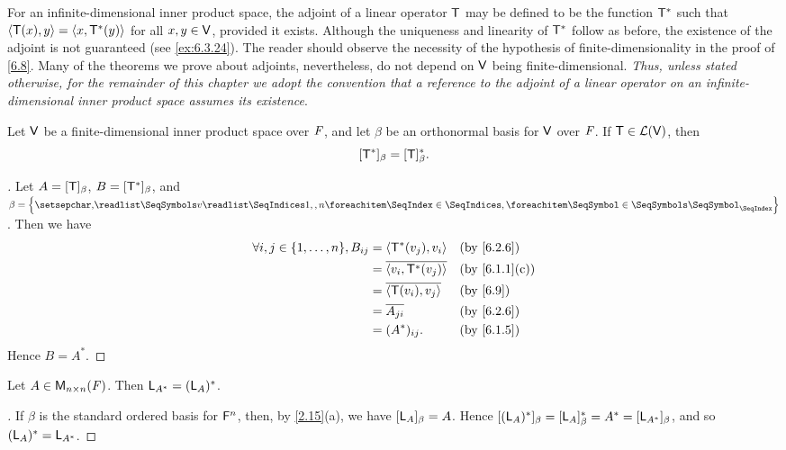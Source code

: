 \begin{note}
	For an infinite-dimensional inner product space, the adjoint of a linear operator \(\mathsf{T}\) may be defined to be the function \(\mathsf{T}^*\) such that \(\left\langle\mathsf{T}(x), y\right\rangle = \left\langle x, \mathsf{T}^*(y)\right\rangle\) for all \(x, y \in \mathsf{V}\), provided it exists.
	Although the uniqueness and linearity of \(\mathsf{T}^*\) follow as before, the existence of the adjoint is not guaranteed (see \cref{ex:6.3.24}).
	The reader should observe the necessity of the hypothesis of finite-dimensionality in the proof of \cref{6.8}.
	Many of the theorems we prove about adjoints, nevertheless, do not depend on \(\mathsf{V}\) being finite-dimensional.
	\emph{Thus, unless stated otherwise, for the remainder of this chapter we adopt the convention that a reference to the adjoint of a linear operator on an infinite-dimensional inner product space assumes its existence}.
\end{note}

\begin{thm}\label{6.10}
	Let \(\mathsf{V}\) be a finite-dimensional inner product space over \(\mathit{F}\), and let \(\beta\) be an orthonormal basis for \(\mathsf{V}\) over \(\mathit{F}\).
	If \(\mathsf{T} \in \mathcal{L}(\mathsf{V})\), then
	\[
		[\mathsf{T}^*]_{\beta} = [\mathsf{T}]_{\beta}^*.
	\]
\end{thm}

\begin{proof}[]
	Let \(A = [\mathsf{T}]_{\beta}\), \(B = [\mathsf{T}^*]_{\beta}\), and \(\beta = \set{\seq{v}{1,,n}}\).
	Then we have
	\begin{align*}
		\forall i, j \in \set{1, \dots, n}, B_{i j} & = \inn{\T^*(v_j), v_i}        &  & \by{6.2.6}    \\
		                                            & = \conj{\inn{v_i, \T^*(v_j)}} &  & \by{6.1.1}[c] \\
		                                            & = \conj{\inn{\T(v_i), v_j}}   &  & \by{6.9}      \\
		                                            & = \conj{A_{j i}}              &  & \by{6.2.6}    \\
		                                            & = (A^*)_{i j}.                &  & \by{6.1.5}
	\end{align*}
	Hence \(B = A^*\).
\end{proof}

\begin{cor}\label{6.3.1}
	Let \(A \in \mathsf{M}_{{n} \times n}({\mathit{F}})\).
	Then \(\mathsf{L}_{A^*} = (\mathsf{L}_A)^*\).
\end{cor}

\begin{proof}[]
	If \(\beta\) is the standard ordered basis for \(\mathsf{F}^n\), then, by \cref{2.15}(a), we have \([\mathsf{L}_A]_{\beta} = A\).
	Hence \([(\mathsf{L}_A)^*]_{\beta} = [\mathsf{L}_A]_{\beta}^* = A^* = [\mathsf{L}_{A^*}]_{\beta}\), and so \((\mathsf{L}_A)^* = \mathsf{L}_{A^*}\).
\end{proof}

